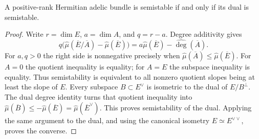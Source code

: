 \begin{lemma}
\label{lem:adelic-dual-semistability}
\leanok
A positive-rank Hermitian adelic bundle is semistable if and only if its
dual is semistable.
\end{lemma}
\begin{proof}
Write $r=\dim E$, $a=\dim A$, and $q=r-a$. Degree additivity gives
\[
 q\bigl(\widehat\mu(\overline E/\overline A)
                -\widehat\mu(\overline E)\bigr)
   =a\widehat\mu(\overline E)-\widehat{\deg}(\overline A).
\]
For $a,q>0$ the right side is nonnegative precisely when
$\widehat\mu(\overline A)\le\widehat\mu(\overline E)$. For $A=0$
the quotient inequality is equality; for $A=E$ the subspace inequality is
equality. Thus semistability is equivalent to all nonzero quotient slopes
being at least the slope of $E$.
Every subspace $B\subset E^\vee$ is isometric to the dual of
$E/B^\perp$. The dual degree identity turns that quotient inequality into
$\widehat\mu(\overline B)\le-\widehat\mu(\overline E)
=\widehat\mu(\overline E^\vee)$.
This proves semistability of the dual. Applying the same argument to the
dual, and using the canonical isometry $E\simeq E^{\vee\vee}$, proves
the converse.
\end{proof}

